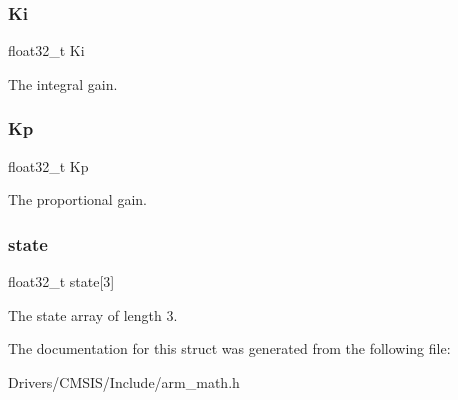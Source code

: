 \subsubsection{\texorpdfstring{Ki}{Ki}}
{\footnotesize\ttfamily float32\+\_\+t Ki}

The integral gain. \mbox{\label{structarm__pid__instance__f32_abe23f3e122ef5f55398fcf77c793c425}} 
\subsubsection{\texorpdfstring{Kp}{Kp}}
{\footnotesize\ttfamily float32\+\_\+t Kp}

The proportional gain. \mbox{\label{structarm__pid__instance__f32_a473556ac6100fc188e77930d56f51062}} 
\subsubsection{\texorpdfstring{state}{state}}
{\footnotesize\ttfamily float32\+\_\+t state\mbox{[}3\mbox{]}}

The state array of length 3. 

The documentation for this struct was generated from the following file\+:\begin{DoxyCompactItemize}
\item 
Drivers/\+C\+M\+S\+I\+S/\+Include/arm\+\_\+math.\+h\end{DoxyCompactItemize}
